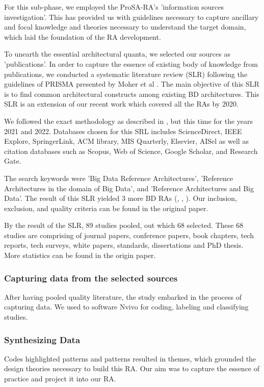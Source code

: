 \documentclass[runningheads]{llncs}
\begin{document}
For this sub-phase, we employed the ProSA-RA's 'information sources investigation'. This has provided us with guidelines necessary to capture ancillary and focal knowledge and theories necessary to understand the target domain, which laid the foundation of the RA development. 

To unearth the essential architectural quanta, we selected our sources as 'publications'. In order to capture the essence of existing body of knowledge from publications, we conducted a systematic literature review (SLR) following the guidelines of PRISMA presented by Moher et al \cite{Shamseer}. The main objective of this SLR is to find common architectural constructs among existing BD architectures. This SLR is an extension of our recent work \cite{AtaeiACIS} which covered all the RAs by 2020. 

We followed the exact methodology as described in \cite{AtaeiACIS}, but this time for the years 2021 and 2022. Databases chosen for this SRL includes ScienceDirect, IEEE Explore, SpringerLink, ACM
library, MIS Quarterly, Elsevier, AISel as well as citation databases such as Scopus, Web of Science, Google Scholar, and Research Gate. 

The search keywords were  ’Big Data Reference Architectures’, ’Reference Architectures in the domain of Big Data’, and ’Reference Architectures and Big Data’. The result of this SLR yielded 3 more BD RAs (\cite{castellanos2021smart}, \cite{sang2017simplifying}, \cite{AtaeiApsec}). Our inclusion, exclusion, and quality criteria can be found in the original paper. 

By the result of the SLR, 89 studies pooled, out which 68 selected. These 68 studies are comprising of journal papers, conference papers, book chapters, tech reports, tech surveys, white papers, standards, dissertations and PhD thesis. More statistics can be found in the origin paper. 

\subsubsection{Capturing data from the selected sources\\}
After having pooled quality literature, the study embarked in the process of capturing data. We used to software Nvivo for coding, labeling and classifying studies. 

\subsubsection*{Synthesizing Data\\}
Codes highlighted patterns and patterns resulted in themes, which grounded the design theories necessary to build this RA. Our aim was to capture the essence of practice and project it into our RA. 
\end{document}
